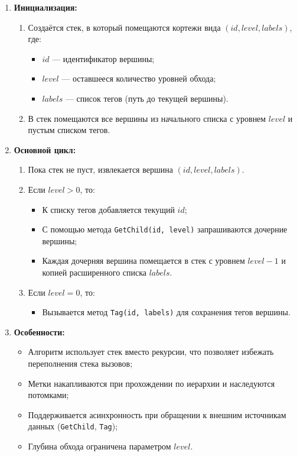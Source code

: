 \begin{enumerate}[label=\arabic*.]
    \item \textbf{Инициализация:}
    \begin{enumerate}[label=\arabic*.]
        \item Создаётся стек, в который помещаются кортежи вида $(id, level, labels)$, где:
        \begin{itemize}
            \item $id$ --- идентификатор вершины;
            \item $level$ --- оставшееся количество уровней обхода;
            \item $labels$ --- список тегов (путь до текущей вершины).
        \end{itemize}
        \item В стек помещаются все вершины из начального списка с уровнем $level$ и пустым списком тегов.
    \end{enumerate}

    \item \textbf{Основной цикл:}
    \begin{enumerate}[label=\arabic*.]
        \item Пока стек не пуст, извлекается вершина $(id, level, labels)$.
        \item Если $level > 0$, то:
        \begin{itemize}
            \item К списку тегов добавляется текущий $id$;
            \item С помощью метода \texttt{GetChild(id, level)} запрашиваются дочерние вершины;
            \item Каждая дочерняя вершина помещается в стек с уровнем $level - 1$ и копией расширенного списка $labels$.
        \end{itemize}
        \item Если $level = 0$, то:
        \begin{itemize}
            \item Вызывается метод \texttt{Tag(id, labels)} для сохранения тегов вершины.
        \end{itemize}
    \end{enumerate}

    \item \textbf{Особенности:}
    \begin{itemize}
        \item Алгоритм использует стек вместо рекурсии, что позволяет избежать переполнения стека вызовов;
        \item Метки накапливаются при прохождении по иерархии и наследуются потомками;
        \item Поддерживается асинхронность при обращении к внешним источникам данных (\texttt{GetChild}, \texttt{Tag});
        \item Глубина обхода ограничена параметром $level$.
    \end{itemize}
\end{enumerate}


